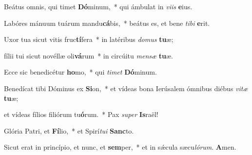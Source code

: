 \item Beátus omnis, qui timet \textbf{Dó}minum,~* qui ámbulat in \textit{viis} \textbf{e}ius.

\item Labóres mánuum tuárum mandu\textbf{cá}bis,~* beátus es, et bene \textit{tibi} \textbf{e}rit.

\item Uxor tua sicut vitis fruc\textbf{tí}fera~* in latéribus \textit{domus} \textbf{tu}æ;

\item fílii tui sicut novéllæ oli\textbf{vá}rum~* in circúitu \textit{mensæ} \textbf{tu}æ.

\item Ecce sic benedicétur \textbf{ho}mo,~* qui \textit{timet} \textbf{Dó}minum.

\item Benedícat tibi Dóminus ex \textbf{Si}on,~* et vídeas bona Ierúsalem ómnibus diébus \textit{vitæ} \textbf{tu}æ;

\item et vídeas fílios filiórum tu\textbf{ó}rum.~* Pax \textit{super} \textbf{Is}raël!

\item Glória Patri, et \textbf{Fí}lio,~* et Spirí\textit{tui} \textbf{Sanc}to.

\item Sicut erat in princípio, et nunc, et \textbf{sem}per,~* et in sǽcula sæcu\textit{lórum}. \textbf{A}men.